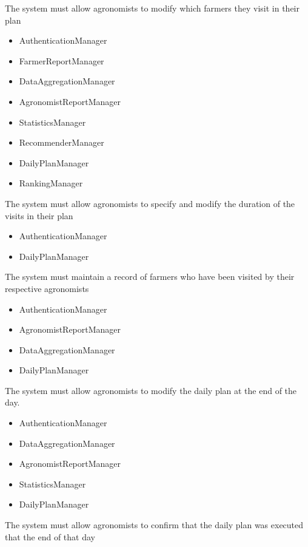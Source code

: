 \begin{itemize}
\begin{itemize}
\end{itemize}
  The system must allow agronomists to modify which farmers they visit in their plan
\begin{itemize}

\item AuthenticationManager
\item FarmerReportManager
\item DataAggregationManager
\item AgronomistReportManager
\item StatisticsManager
\item RecommenderManager
\item DailyPlanManager
\item RankingManager

\end{itemize}

  The system must allow agronomists to specify and modify the duration of the visits in their plan
\begin{itemize}

\item AuthenticationManager
\item DailyPlanManager

\end{itemize}
  The system must maintain a record of farmers who have been visited by their respective agronomists
\begin{itemize}

\item AuthenticationManager
\item AgronomistReportManager
\item DataAggregationManager
\item DailyPlanManager

\end{itemize}
 The system must allow agronomists to modify the daily plan at the end of the day.
\begin{itemize}

\item AuthenticationManager
\item DataAggregationManager
\item AgronomistReportManager
\item StatisticsManager
\item DailyPlanManager

\end{itemize}
 The system must allow agronomists to confirm that the daily plan was executed that the end of that day
\begin{itemize}


\end{itemize}
\end{itemize}
